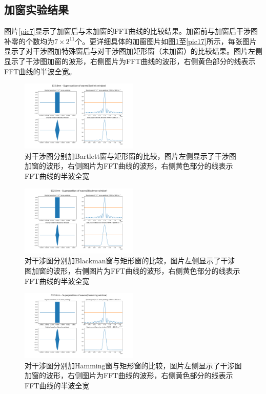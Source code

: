 \documentclass[conference]{IEEEtran}
\begin{document}
\subsection{加窗实验结果}
图片\ref{pic7}显示了加窗后与未加窗的FFT曲线的比较结果。加窗前与加窗后干涉图补零的个数均为$7\times2^{11}$个。更详细具体的加窗图片如图\ref{pic13}至\ref{pic17}所示，每张图片显示了对干涉图加特殊窗后与对干涉图加矩形窗（未加窗）的比较结果。图片左侧显示了干涉图加窗的波形，右侧图片为FFT曲线的波形，右侧黄色部分的线表示FFT曲线的半波全宽。
\begin{figure}[htbp]
    \centerline{\includegraphics[width=0.5\textwidth]{Bartlett.png}}
    \caption{对干涉图分别加Bartlett窗与矩形窗的比较，图片左侧显示了干涉图加窗的波形，右侧图片为FFT曲线的波形，右侧黄色部分的线表示FFT曲线的半波全宽}
    \label{pic13}
\end{figure}

\begin{figure}[htbp]
    \centerline{\includegraphics[width=0.5\textwidth]{Blackman.png}}
    \caption{对干涉图分别加Blackman窗与矩形窗的比较，图片左侧显示了干涉图加窗的波形，右侧图片为FFT曲线的波形，右侧黄色部分的线表示FFT曲线的半波全宽}
    \label{pic14}
\end{figure}

\begin{figure}[htbp]
    \centerline{\includegraphics[width=0.5\textwidth]{hamming.png}}
    \caption{对干涉图分别加Hamming窗与矩形窗的比较，图片左侧显示了干涉图加窗的波形，右侧图片为FFT曲线的波形，右侧黄色部分的线表示FFT曲线的半波全宽}
    \label{pic15}
\end{figure}
\end{document}
